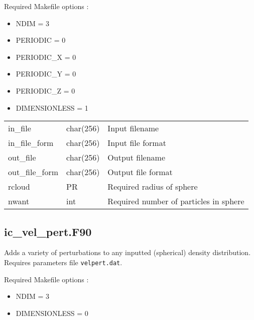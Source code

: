 \documentclass[a4paper]{article}
\newcommand{\var}[1]{\texttt{#1}}
\begin{document}
\noindent Required Makefile options :
\begin{itemize}
\item NDIM = 3
\item PERIODIC = 0
\item PERIODIC\_X = 0
\item PERIODIC\_Y = 0
\item PERIODIC\_Z = 0
\item DIMENSIONLESS = 1
\end{itemize}

\vspace{0.1cm}

\begin{center}
\begin{supertabular}{|p{3cm}|p{2cm}|p{8cm}|}
in\_file         & char(256) & Input filename \\
in\_file\_form   & char(256) & Input file format \\
out\_file        & char(256) & Output filename \\
out\_file\_form  & char(256) & Output file format \\
rcloud           & PR        & Required radius of sphere \\
nwant            & int       & Required number of particles in sphere \\
\end{supertabular}
\end{center}

\newpage


\subsection{ic\_vel\_pert.F90}
Adds a variety of perturbations to any inputted (spherical) density distribution.  Requires parameters file \var{velpert.dat}. \newline

\noindent Required Makefile options :
\begin{itemize}
\item NDIM = 3
\item DIMENSIONLESS = 0
\end{itemize}

\vspace{0.1cm}
\end{document}
